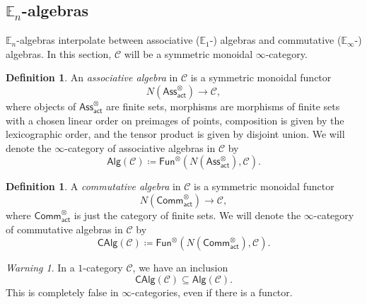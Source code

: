 \documentclass[10pt, oneside]{memoir}
\theoremstyle{definition}
\newtheorem{defn}[thm]{Definition}
\theoremstyle{remark}
\newtheorem{warn}[thm]{Warning}
\theoremstyle{plain}
\theoremstyle{definition}
\theoremstyle{remark}
\newcommand{\E}{\mathbb{E}}
\newcommand{\mc}[1]{\mathcal{#1}}
\newcommand{\ms}[1]{\mathsf{#1}}
\newcommand{\1}{\mathbf{1}}
\newcommand{\2}{\mathbf{2}}
\newcommand{\3}{\mathbf{3}}
\begin{document}
\subsection{\(\E_n \)-algebras}%
\label{sub:En-algebras}

\(\E_n \)-algebras interpolate between associative (\(\E_1 \)-) algebras and commutative (\(\E_{\infty} \)-) algebras. In this section, \(\mc{C} \) will be a symmetric monoidal \(\infty \)-category.

\begin{defn}
    An \textit{associative algebra} in \(\mc{C} \) is a symmetric monoidal functor
    \[ N(\ms{Ass}_{\ms{act}}^{\otimes}) \to \mc{C}, \]
    where objects of \(\ms{Ass}_{\ms{act}}^{\otimes} \) are finite sets, morphisms are morphisms of finite sets with a chosen linear order on preimages of points, composition is given by the lexicographic order, and the tensor product is given by disjoint union. We will denote the \(\infty \)-category of associative algebras in \(\mc{C} \) by
    \[ \ms{Alg}(\mc{C}) \coloneqq \ms{Fun}^{\otimes}(N(\ms{Ass}_{\ms{act}}^{\otimes}), \mc{C}). \]
\end{defn}

\begin{defn}
    A \textit{commutative algebra} in \(\mc{C} \) is a symmetric monoidal functor
    \[ N(\ms{Comm}_{\ms{act}}^{\otimes}) \to \mc{C}, \]
    where \(\ms{Comm}_{\ms{act}}^{\otimes} \) is just the category of finite sets. We will denote the \(\infty \)-category of commutative algebras in \(\mc{C} \) by
    \[ \ms{CAlg}(\mc{C}) \coloneqq \ms{Fun}^{\otimes}(N(\ms{Comm}_{\ms{act}}^{\otimes}), \mc{C}). \]
\end{defn}

\begin{warn}
    In a \(1 \)-category \(\mc{C} \), we have an inclusion
    \[ \ms{CAlg}(\mc{C}) \subseteq \ms{Alg}(\mc{C}). \]
    This is completely false in \(\infty \)-categories, even if there is a functor.
\end{warn}
\end{document}
